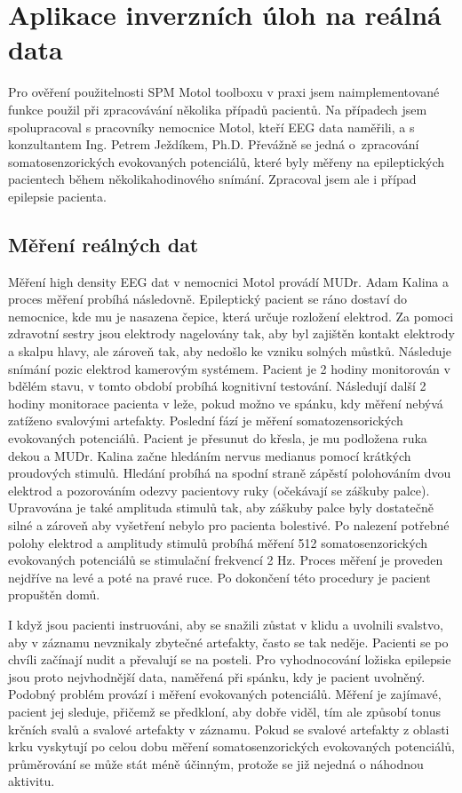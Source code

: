 \section{Aplikace inverzních úloh na reálná data}
Pro ověření použitelnosti SPM Motol toolboxu v praxi jsem naimplementované funkce použil při zpracovávání několika případů pacientů. Na případech jsem spolupracoval s pracovníky nemocnice Motol, kteří EEG data naměřili, a s konzultantem Ing. Petrem Ježdíkem, Ph.D.  Převážně se jedná o~zpracování somatosenzorických evokovaných potenciálů, které byly měřeny na epileptických pacientech během několikahodinového snímání. Zpracoval jsem ale i případ epilepsie pacienta.

\subsection{Měření reálných dat}
Měření high density EEG dat v nemocnici Motol provádí MUDr. Adam Kalina a proces měření probíhá následovně. Epileptický pacient se ráno dostaví do nemocnice, kde mu je nasazena čepice, která určuje rozložení elektrod. Za pomoci zdravotní sestry jsou elektrody nagelovány tak, aby byl zajištěn kontakt elektrody a skalpu hlavy, ale zároveň tak, aby nedošlo ke vzniku solných můstků. Následuje snímání pozic elektrod kamerovým systémem. Pacient je 2 hodiny monitorován v bdělém stavu, v tomto období probíhá kognitivní testování. Následují další 2 hodiny monitorace pacienta v leže, pokud možno ve spánku, kdy měření nebývá zatíženo svalovými artefakty. Poslední fází je měření somatozensorických evokovaných potenciálů. Pacient je přesunut do křesla, je mu podložena ruka dekou a MUDr. Kalina začne hledáním nervus medianus pomocí krátkých proudových stimulů. Hledání probíhá na spodní straně zápěstí polohováním dvou elektrod a pozorováním odezvy pacientovy ruky (očekávají se záškuby palce). Upravována je také amplituda stimulů tak, aby záškuby palce byly dostatečně silné a zároveň aby vyšetření nebylo pro pacienta bolestivé. Po nalezení potřebné polohy elektrod a amplitudy stimulů probíhá měření 512 somatosenzorických evokovaných potenciálů se stimulační frekvencí 2 Hz. Proces měření je proveden nejdříve na levé a poté na pravé ruce. Po dokončení této procedury je pacient propuštěn domů. \cite{67}

I když jsou pacienti instruováni, aby se snažili zůstat v klidu a uvolnili svalstvo, aby v záznamu nevznikaly zbytečné artefakty, často se tak neděje. Pacienti se po chvíli začínají nudit a převalují se na posteli. Pro vyhodnocování ložiska epilepsie jsou proto nejvhodnější data, naměřená při spánku, kdy je pacient uvolněný. Podobný problém provází i měření evokovaných potenciálů. Měření je zajímavé, pacient jej sleduje, přičemž se předkloní, aby dobře viděl, tím ale způsobí tonus krčních svalů a svalové artefakty v záznamu. Pokud se svalové artefakty z oblasti krku vyskytují po celou dobu měření somatosenzorických evokovaných potenciálů, průměrování se může stát méně účinným, protože se již nejedná o náhodnou aktivitu.

